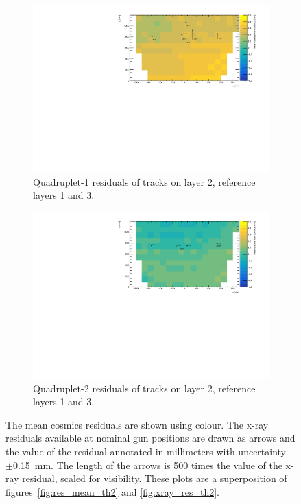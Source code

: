 \newpage
\thispagestyle{empty}
\begin{figure}
\centering
\begin{subfigure}{\textwidth}
  \centering
  \includegraphics[width=\linewidth]{figures/QL2P11_compare_residuals_th2_layer2_fixedlayers13.pdf}
  \caption{Quadruplet-1 residuals of tracks on layer 2, reference layers 1 and 3.}
  \label{fig:res_compare_th2_ql2p11}
\end{subfigure}%
\vspace*{\floatsep}
\begin{subfigure}{\textwidth}
  \centering
  \includegraphics[width=\linewidth]{figures/QL2P08_compare_residuals_th2_layer2_fixedlayers13.pdf}
  \caption{Quadruplet-2 residuals of tracks on layer 2, reference layers 1 and 3.}
  \label{fig:res_compare_th2_ql2p8}
\end{subfigure}
\caption{The mean cosmics residuals are shown using colour. The x-ray residuals available at nominal gun positions are drawn as arrows and the value of the residual annotated in millimeters with uncertainty $\pm$\SI{0.15}{mm}. The length of the arrows is 500 times the value of the x-ray residual, scaled for visibility. These plots are a superposition of figures~\ref{fig:res_mean_th2} and \ref{fig:xray_res_th2}.}
\label{fig:res_compare_th2}
\end{figure}
\newpage
\restoregeometry

